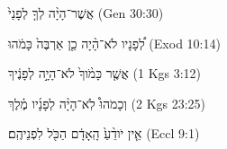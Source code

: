 
\begin{exe}

\ex\label{antsffx_exs1}
\texthebrew{
אֲשֶׁר־הָיָ֨ה לְךָ֤ לְפָנַי֙ 
} (Gen 30:30)

\ex\label{antsffx_exs2}
\texthebrew{
לְ֠פָנָיו לֹא־הָ֨יָה כֵ֤ן אַרְבֶּה֙ כָּמֹ֔הוּ 
} (Exod 10:14)

\ex\label{antsffx_exs3}
\texthebrew{
אֲשֶׁ֤ר כָּמֹ֨וךָ֙ לֹא־הָיָ֣ה לְפָנֶ֔יךָ 
} (1 Kgs 3:12)

\ex\label{antsffx_exs4}
\texthebrew{
וְכָמֹהוּ֩ לֹֽא־הָיָ֨ה לְפָנָ֜יו מֶ֗לֶךְ 
} (2 Kgs 23:25)

\ex\label{antsffx_exs5}
\texthebrew{
אֵ֤ין יֹודֵ֨עַ֙ הָֽאָדָ֔ם הַכֹּ֖ל לִפְנֵיהֶֽם׃ 
} (Eccl 9:1)

\end{exe}
